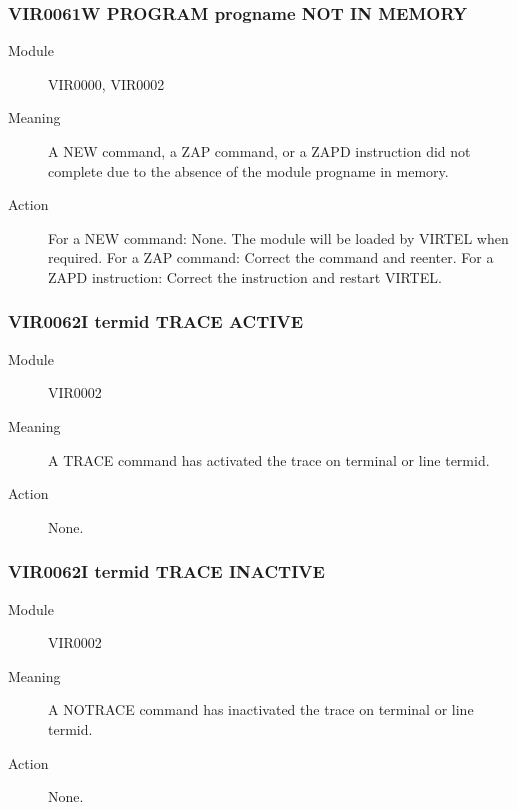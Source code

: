 \documentclass[letterpaper,10pt,english]{sphinxmanual}
\begin{document}
\subsubsection{VIR0061W PROGRAM progname NOT IN MEMORY}
\label{\detokenize{messages:vir0061w-program-progname-not-in-memory}}\begin{description}
\item[{Module}] \leavevmode
VIR0000, VIR0002

\item[{Meaning}] \leavevmode
A NEW command, a ZAP command, or a ZAPD instruction did not complete due to the absence of the module progname in memory.

\item[{Action}] \leavevmode
For a NEW command: None. The module will be loaded by VIRTEL when required. For a ZAP command: Correct the command and reenter. For a ZAPD instruction: Correct the instruction and restart VIRTEL.

\end{description}


\subsubsection{VIR0062I termid TRACE ACTIVE}
\label{\detokenize{messages:vir0062i-termid-trace-active}}\begin{description}
\item[{Module}] \leavevmode
VIR0002

\item[{Meaning}] \leavevmode
A TRACE command has activated the trace on terminal or line termid.

\item[{Action}] \leavevmode
None.

\end{description}


\subsubsection{VIR0062I termid TRACE INACTIVE}
\label{\detokenize{messages:vir0062i-termid-trace-inactive}}\begin{description}
\item[{Module}] \leavevmode
VIR0002

\item[{Meaning}] \leavevmode
A NOTRACE command has inactivated the trace on terminal or line termid.

\item[{Action}] \leavevmode
None.

\end{description}
\end{document}
